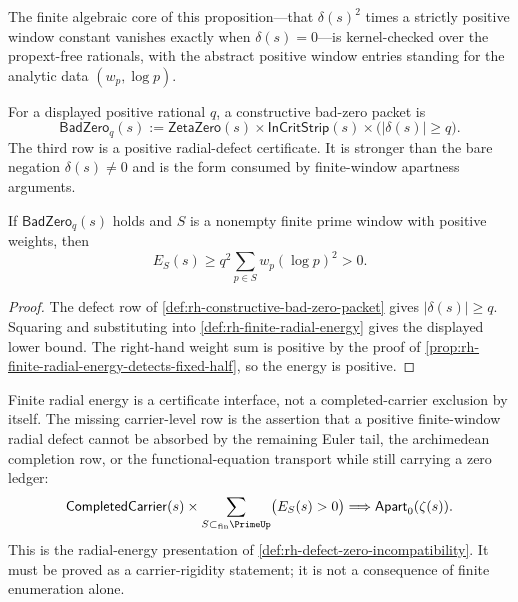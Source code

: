 The finite algebraic core of this proposition---that $\delta(s)^2$ times a
strictly positive window constant vanishes exactly when $\delta(s)=0$---is
kernel-checked over the propext-free rationals, with the abstract positive
window entries standing for the analytic data $(w_p,\log p)$.

\begin{definition}
\label{def:rh-constructive-bad-zero-packet}
For a displayed positive rational $q$, a constructive bad-zero packet is
$$
\mathsf{BadZero}_q(s)
:=
\mathsf{ZetaZero}(s)
\times
\mathsf{InCritStrip}(s)
\times
\bigl(|\delta(s)|\ge q\bigr).
$$
The third row is a positive radial-defect certificate.  It is stronger than
the bare negation $\delta(s)\neq0$ and is the form consumed by finite-window
apartness arguments.
\end{definition}

\begin{proposition}
\label{prop:rh-bad-zero-creates-finite-radial-energy}
If $\mathsf{BadZero}_q(s)$ holds and $S$ is a nonempty finite prime window
with positive weights, then
$$
E_S(s)
\ge
q^2\sum_{p\in S}w_p(\log p)^2
>
0.
$$
\end{proposition}

\begin{proof}
The defect row of \autoref{def:rh-constructive-bad-zero-packet} gives
$|\delta(s)|\ge q$.  Squaring and substituting into
\autoref{def:rh-finite-radial-energy} gives the displayed lower bound.  The
right-hand weight sum is positive by the proof of
\autoref{prop:rh-finite-radial-energy-detects-fixed-half}, so the energy is
positive.
\end{proof}

\begin{principle}
\label{prin:rh-no-tail-absorption-row}
Finite radial energy is a certificate interface, not a completed-carrier
exclusion by itself.  The missing carrier-level row is the assertion that a
positive finite-window radial defect cannot be absorbed by the remaining
Euler tail, the archimedean completion row, or the functional-equation
transport while still carrying a zero ledger:
$$
\mathsf{CompletedCarrier}(s)
\times
\sum_{S\subset_{\mathrm{fin}}\PrimeUp}
\bigl(E_S(s)>0\bigr)
\Longrightarrow
\mathsf{Apart}_{0}(\zeta(s)).
$$
This is the radial-energy presentation of
\autoref{def:rh-defect-zero-incompatibility}.  It must be proved as a
carrier-rigidity statement; it is not a consequence of finite enumeration
alone.
\end{principle}

